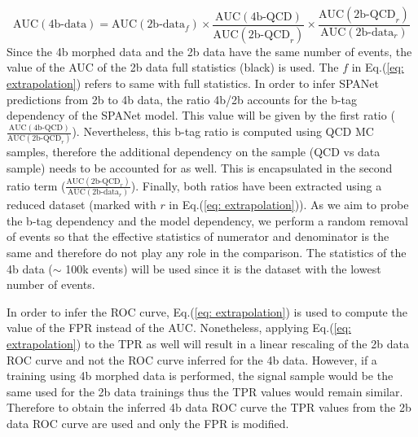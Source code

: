 \begin{equation}
    \text{AUC}(\text{4b-data})= \text{AUC}(\text{2b-data}_f) \times {\frac{\text{AUC}(\text{4b-QCD})}{\text{AUC}(\text{2b-QCD}_r)}} \times {\frac{\text{AUC}(\text{2b-QCD}_r)}{\text{AUC}(\text{2b-data}_r)}}
    \label{eq: extrapolation}
\end{equation} 
\noindent Since the 4b morphed data and the 2b data have the same number of events, the value of the AUC of the 2b data full statistics (black) is used. The $f$ in Eq.(\ref{eq: extrapolation}) refers to same with full statistics. In order to infer SPANet predictions from 2b to 4b data, the ratio 4b/2b accounts for the b-tag dependency of the SPANet model. This value will be given by the first ratio (${\frac{\text{AUC}(\text{4b-QCD})}{\text{AUC}(\text{2b-QCD}_r)}}$). Nevertheless, this b-tag ratio is computed using QCD MC samples, therefore the additional dependency on the sample (QCD vs data sample) needs to be accounted for as well. This is encapsulated in the second ratio term (${\frac{\text{AUC}(\text{2b-QCD}_r)}{\text{AUC}(\text{2b-data}_r)}}$). Finally, both ratios have been extracted using a reduced dataset (marked with $r$ in Eq.(\ref{eq: extrapolation})). As we aim to probe the b-tag dependency and the model dependency, we perform a random removal of events so that the effective statistics of numerator and denominator is the same and therefore do not play any role in the comparison. The statistics of the 4b data ($\sim$ 100k events) will be used since it is the dataset with the lowest number of events.

In order to infer the ROC curve, Eq.(\ref{eq: extrapolation}) is used to compute the value of the FPR instead of the AUC. Nonetheless, applying Eq.(\ref{eq: extrapolation}) to the TPR as well will result in a linear rescaling of the 2b data ROC curve and not the ROC curve inferred for the 4b data. However, if a training using 4b morphed data is performed, the signal sample would be the same used for the 2b data trainings thus the TPR values would remain similar. Therefore to obtain the inferred 4b data ROC curve the TPR values from the 2b data ROC curve are used and only the FPR is modified.



